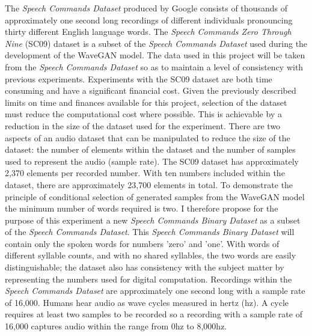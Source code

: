 \documentclass[a4paper, dvipsnames, titlepage]{article}
\begin{document}
The \textit{Speech Commands Dataset} \citep{speechcommands} produced by Google consists of thousands of approximately one second long recordings of different individuals pronouncing thirty different English language words.
The \textit{Speech Commands Zero Through Nine} (SC09) dataset is a subset of the \textit{Speech Commands Dataset} used during the development of the WaveGAN model.
The data used in this project will be taken from the \textit{Speech Commands Dataset} so as to maintain a level of consistency with previous experiments.
\newline
\newline
Experiments with the SC09 dataset are both time consuming and have a significant financial cost.
Given the previously described limits on time and finances available for this project, selection of the dataset must reduce the computational cost where possible.
This is achievable by a reduction in the size of the dataset used for the experiment.
There are two aspects of an audio dataset that can be manipulated to reduce the size of the dataset: the number of elements within the dataset and the number of samples used to represent the audio (sample rate).
\newline
\newline
The SC09 dataset has approximately 2,370 elements per recorded number.
With ten numbers included within the dataset, there are approximately 23,700 elements in total.
To demonstrate the principle of conditional selection of generated samples from the WaveGAN model the minimum number of words required is two.
I therefore propose for the purpose of this experiment a new \textit{Speech Commands Binary Dataset} as a subset of the \textit{Speech Commands Dataset}.
\newline
\newline
This \textit{Speech Commands Binary Dataset} will contain only the spoken words for numbers 'zero' and 'one'.
With words of different syllable counts, and with no shared syllables, the two words are easily distinguishable; the dataset also has consistency with the subject matter by representing the numbers used for digital computation.
\newline
\newline
Recordings within the \textit{Speech Commands Dataset} are approximately one second long with a sample rate of 16,000.
Humans hear audio as wave cycles measured in hertz (hz).
A cycle requires at least two samples to be recorded so a recording with a sample rate of 16,000 captures audio within the range from 0hz to 8,000hz.
\end{document}
